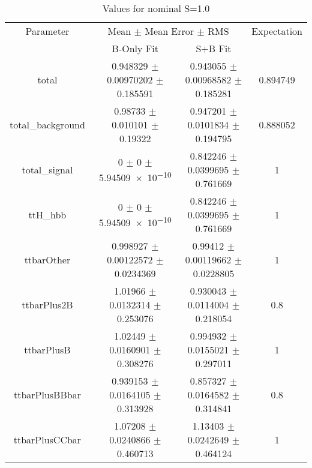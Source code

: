 \begin{table}
\centering
\caption{Values for nominal S=1.0}
\begin{tabular}{cccc}
\toprule
Parameter & \multicolumn{2}{c}{Mean $\pm$ Mean Error $\pm$ RMS} & Expectation\\
 & B-Only Fit & S+B Fit & \\
\midrule
total & \num{0.948329} $\pm$ \num{0.00970202} $\pm$ \num{0.185591} & \num{0.943055} $\pm$ \num{0.00968582} $\pm$ \num{0.185281} & \num{0.894749}\\
total\_background & \num{0.98733} $\pm$ \num{0.010101} $\pm$ \num{0.19322} & \num{0.947201} $\pm$ \num{0.0101834} $\pm$ \num{0.194795} & \num{0.888052}\\
total\_signal & \num{0} $\pm$ \num{0} $\pm$ \num{5.94509e-10} & \num{0.842246} $\pm$ \num{0.0399695} $\pm$ \num{0.761669} & \num{1}\\
ttH\_hbb & \num{0} $\pm$ \num{0} $\pm$ \num{5.94509e-10} & \num{0.842246} $\pm$ \num{0.0399695} $\pm$ \num{0.761669} & \num{1}\\
ttbarOther & \num{0.998927} $\pm$ \num{0.00122572} $\pm$ \num{0.0234369} & \num{0.99412} $\pm$ \num{0.00119662} $\pm$ \num{0.0228805} & \num{1}\\
ttbarPlus2B & \num{1.01966} $\pm$ \num{0.0132314} $\pm$ \num{0.253076} & \num{0.930043} $\pm$ \num{0.0114004} $\pm$ \num{0.218054} & \num{0.8}\\
ttbarPlusB & \num{1.02449} $\pm$ \num{0.0160901} $\pm$ \num{0.308276} & \num{0.994932} $\pm$ \num{0.0155021} $\pm$ \num{0.297011} & \num{1}\\
ttbarPlusBBbar & \num{0.939153} $\pm$ \num{0.0164105} $\pm$ \num{0.313928} & \num{0.857327} $\pm$ \num{0.0164582} $\pm$ \num{0.314841} & \num{0.8}\\
ttbarPlusCCbar & \num{1.07208} $\pm$ \num{0.0240866} $\pm$ \num{0.460713} & \num{1.13403} $\pm$ \num{0.0242649} $\pm$ \num{0.464124} & \num{1}\\
\bottomrule
\end{tabular}
\end{table}